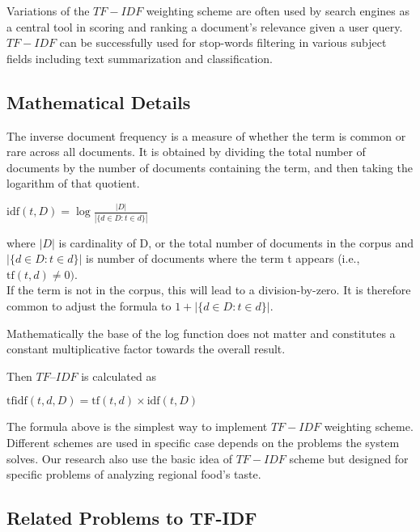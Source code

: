 Variations of the $TF-IDF$ weighting scheme are often used by search engines as a central tool in scoring and ranking a document's relevance given a user query. $TF-IDF$ can be successfully used for stop-words filtering in various subject fields including text summarization and classification.


\subsection{Mathematical Details}\label{sec:bg_detail}

The inverse document frequency is a measure of whether the term is common or rare across all documents. It is obtained by dividing the total number of documents by the number of documents containing the term, and then taking the logarithm of that quotient.

\begin{center}
\smallskip
$\mathrm{idf}(t, D) = \log \frac{\displaystyle |D|}{\displaystyle |\{d \in D: t \in d\}|}$
\smallskip
\end{center}


where $|D|$ is cardinality of D, or the total number of documents in the corpus and $|\{d \in D: t \in d\}|$ is number of documents where the term t appears (i.e., $\mathrm{tf}(t,d) \neq 0)$. \\

If the term is not in the corpus, this will lead to a division-by-zero. It is therefore common to adjust the formula to $1 + |\{d \in D: t \in d\}|$.

Mathematically the base of the log function does not matter and constitutes a constant multiplicative factor towards the overall result.

Then $TF–IDF$ is calculated as
\begin{center}
\smallskip
$\mathrm{tfidf}(t,d,D) = \mathrm{tf}(t,d) \times \mathrm{idf}(t, D)$ 
\smallskip
\end{center}

The formula above is the simplest way to implement $TF-IDF$ weighting scheme. Different schemes are used in specific case depends on the problems the system solves. Our research also use the basic idea of $TF-IDF$ scheme but designed for specific problems of analyzing regional food's taste.  


\subsection{Related Problems to TF-IDF}\label{sec:bg_prob}

